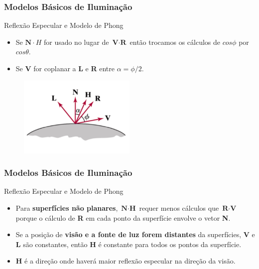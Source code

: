 \documentclass{beamer}
\begin{document}
\begin{frame}
\frametitle{Modelos Básicos de Iluminação}

	\begin{block}{Reflexão Especular e Modelo de Phong}
		\begin{itemize}
			\item Se $\textbf{N} \cdot H$ for usado no lugar de $\textbf{V} \cdot \textbf{R}$ então trocamos os cálculos de $cos \phi$ por $cos \theta$.
			\item Se \textbf{V} for coplanar a \textbf{L} e \textbf{R} entre $\alpha = \phi/2$.
		\end{itemize}
	\end{block}
	
	\begin{figure}[!h]
		\begin{center}
		\includegraphics[width=0.5\textwidth]{Figures/VecH}
		\end{center}
	\end{figure}	
\end{frame}

\begin{frame}
\frametitle{Modelos Básicos de Iluminação}

	\begin{block}{Reflexão Especular e Modelo de Phong}
		\begin{itemize}
			\item Para \textbf{superfícies não planares}, $\textbf{N} \cdot \textbf{H}$ requer menos cálculos que $\textbf{R} \cdot \textbf{V}$ porque o cálculo de \textbf{R} em cada ponto da superfície envolve o vetor \textbf{N}.
			\item Se a posição de \textbf{visão e a fonte de luz forem distantes} da superfícies, \textbf{V} e \textbf{L} são constantes, então \textbf{H} é constante para todos os pontos da superfície.
			\item \textbf{H} é a direção onde haverá maior reflexão especular na direção da visão. 
		\end{itemize}
	\end{block}
\end{frame}
\end{document}
